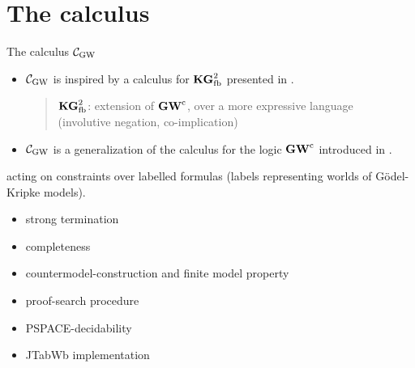 \section{The calculus}


\begin{frame}{The calculus $\mathcal{C}_{\mathrm{GW}}$}

  \small

  \begin{itemize}
  \item 
    $\mathcal{C}_{\mathrm{GW}}$ is inspired by a calculus %
    for $\mathbf{KG}^2_\mathrm{fb}$ presented in
  .
  \begin{quote}
  \medfont  $\mathbf{KG}^2_\mathrm{fb}$: extension of     $\mathbf{GW}^\mathrm{c}$, over a more expressive language\\
(involutive negation,   co-implication)
\end{quote}
  


    

 \item 
   $\mathcal{C}_{\mathrm{GW}}$ is a generalization of the calculus %
   for the logic $\mathbf{GW}^\mathrm{c}$ introduced
   in  .
  
  \end{itemize}
  

  
  \BSK

   acting on constraints over
  labelled formulas (labels representing worlds of G\"odel-Kripke models).
  
  \MSK
  
  \begin{itemize}\small
  \item strong termination
  \item completeness
  \item countermodel-construction and finite model property
  \item proof-search procedure  %
  \item PSPACE-decidability 
  \item JTabWb implementation
  \end{itemize}
    
  \VFILL
\end{frame}


